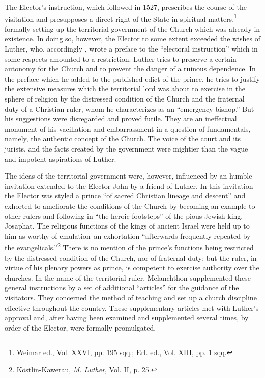 The Elector’s instruction, which followed in 1527, prescribes the
course of the visitation and presupposes a direct right of the State
in spiritual matters,\footnote{Weimar ed., Vol. XXVI, pp. 195 sqq.; Erl. ed., Vol. XIII, pp. 1 sqq.}
formally setting up the territorial government
of the Church which was already in existence. In doing so, however,
the Elector to some extent exceeded the wishes of Luther, who, accordingly
, wrote a preface to the “electoral instruction” which in
some respects amounted to a restriction. Luther tries to preserve
a certain autonomy for the Church and to prevent the danger of a
ruinous dependence. In the preface which he added to the published
edict of the prince, he tries to justify the extensive measures which
the territorial lord was about to exercise in the sphere of religion
by the distressed condition of the Church and the fraternal duty
of a Christian ruler, whom he characterizes as an “emergency
bishop.” But his suggestions were disregarded and proved futile.
They are an ineffectual monument of his vacillation and embarrassment
in a question of fundamentals, namely, the authentic concept
of the Church. The voice of the court and its jurists, and the
facts created by the government were mightier than the vague and
impotent aspirations of Luther.

The ideas of the territorial government were, however, influenced
by an humble invitation extended to the Elector John by a friend
of Luther. In this invitation the Elector was styled a prince “of sacred
Christian lineage and descent” and exhorted to ameliorate the conditions
of the Church by becoming an example to other rulers and
following in “the heroic footsteps” of the pious Jewish king, Josaphat.
The religious functions of the kings of ancient Israel were held
up to him as worthy of emulation--an exhortation “afterwards frequently
repeated by the evangelicals.”\footnote{Köstlin-Kawerau, \textit{M. Luther}, Vol. II, p. 25.}
 There is no mention of the
prince’s functions being restricted by the distressed condition of the
Church, nor of fraternal duty; but the ruler, in virtue of his plenary
powers as prince, is competent to exercise authority over the churches.
In the name of the territorial ruler, Melanchthon supplemented
these general instructions by a set of additional “articles” for the
guidance of the visitators. They concerned the method of teaching
and set up a church discipline effective throughout the country. These
supplementary articles met with Luther’s approval and, after having
been examined and supplemented several times, by order of the Elector,
were formally promulgated.

